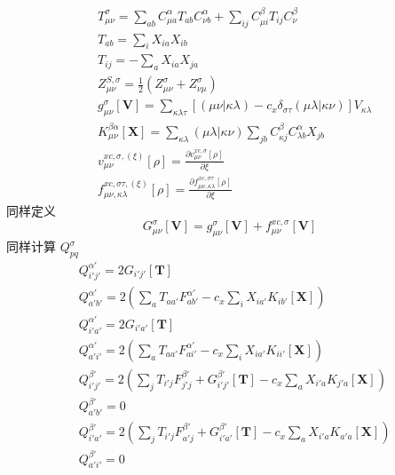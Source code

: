 \documentclass[11pt]{ctexart}
\numberwithin{equation}{section}
\begin{document}
\begin{equation}
    \begin{aligned}
        & T_{\mu\nu}^{\sigma} 
        = \sum_{ab}C_{\mu a}^{\alpha}T_{ab}C_{\nu b}^{\alpha}
        + \sum_{ij}C_{\mu i}^{\beta}T_{ij}C_{\nu}^{\beta}\\
        & T_{ab} = \sum_{i}X_{ia}X_{ib}\\
        & T_{ij} = -\sum_{a}X_{ia}X_{ja}\\
        & Z_{\mu\nu}^{S,\sigma} = \frac{1}{2}(Z_{\mu\nu}^{\sigma} + Z_{\nu\mu}^{\sigma})\\
        & g_{\mu\nu}^{\sigma}[\mathbf{V}] = \sum_{\kappa\lambda\tau}[(\mu\nu|\kappa\lambda)-c_x\delta_{\sigma\tau}(\mu\lambda|\kappa\nu)]V_{\kappa\lambda}\\
        & K_{\mu\nu}^{\beta\alpha}[\mathbf{X}] = \sum_{\kappa\lambda}(\mu\lambda|\kappa\nu)\sum_{jb}C_{\kappa j}^{\beta}C_{\lambda b}^{\alpha}X_{jb}\\
        & v_{\mu\nu}^{xc,\sigma,(\xi)}[\rho] = \frac{\partial v_{\mu\nu}^{xc,\sigma}[\rho]}{\partial \xi}\\
        & f_{\mu\nu,\kappa\lambda}^{xc,\sigma\tau,(\xi)}[\rho] = \frac{\partial f_{\mu\nu,\kappa\lambda}^{xc,\sigma\tau}[\rho]}{\partial\xi}
    \end{aligned}
\end{equation}
同样定义
\begin{equation}
    G_{\mu\nu}^{\sigma}[\mathbf{V}] = g_{\mu\nu}^{\sigma}[\mathbf{V}] + f_{\mu\nu}^{xc,\sigma}[\mathbf{V}]
\end{equation}
同样计算 $Q_{pq}^{\sigma}$
\begin{equation}
    \begin{aligned}
        & Q_{i' j'}^{\alpha'} = 2G_{i' j'}[\mathbf{T}]\\
        & Q_{a' b'}^{\alpha'} = 2\left(
            \sum_{a}T_{aa'}F_{ab'}^{\alpha'}
            - c_x\sum_{i}X_{ia'}K_{ib'}[\mathbf{X}]
        \right)\\
        & Q_{i' a'}^{\alpha'} = 2G_{i' a'}[\mathbf{T}]\\
        & Q_{a' i'}^{\alpha'} = 2\left(
            \sum_{a}T_{aa'}F_{a i'}^{\alpha'} 
            - c_x\sum_{i}X_{ia'}K_{ii'}[\mathbf{X}]
        \right)\\
        & Q_{i' j'}^{\beta'} = 2\left(
            \sum_{j}T_{i'j}F_{j'j}^{\beta'}
            + G_{i'j'}^{\beta'}[\mathbf{T}]
            - c_x \sum_{a}X_{i'a}K_{j'a}[\mathbf{X}]
        \right)\\
        & Q_{a' b'}^{\beta'} = 0\\
        & Q_{i' a'}^{\beta'} = 2\left(
            \sum_{j}T_{i'j}F_{a' j}^{\beta'} 
            + G_{i' a'}^{\beta'}[\mathbf{T}]
            - c_x\sum_{a}X_{i' a}K_{a'a}[\mathbf{X}]
        \right)\\
        & Q_{a' i'}^{\beta'} = 0
    \end{aligned}
\end{equation}
\end{document}
